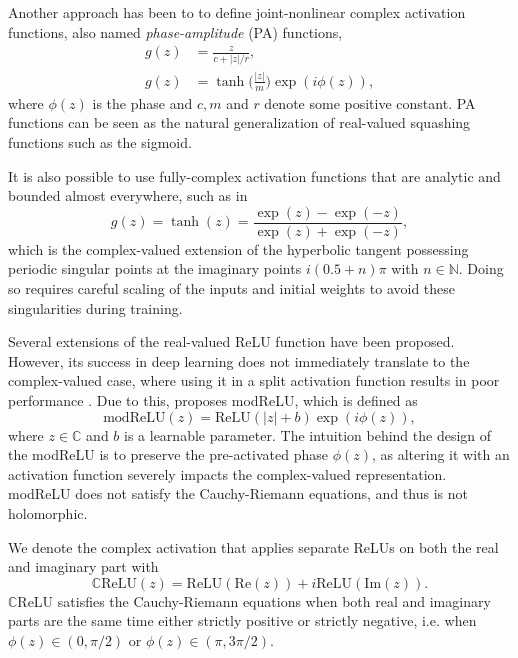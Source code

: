 \documentclass[11pt]{article}
\begin{document}
Another approach has been to to define joint-nonlinear complex activation functions, also named \textit{phase-amplitude} (PA) functions,
\begin{equation}
\begin{split}
g(z) &= \frac{z}{c+|z|/r},\\
g(z) &= \tanh \Big(\frac{|z|}{m}\Big)\exp(i\phi(z)),
\end{split}
\end{equation}
where $\phi(z)$ is the phase and $c, m$ and $r$ denote some positive constant. PA functions can be seen as the natural generalization of real-valued squashing functions such as the sigmoid.

It is also possible to use fully-complex activation functions that are analytic and bounded almost everywhere, such as in
\begin{equation}
g(z) = \tanh(z) = \frac{\exp(z)-\exp(-z)}{\exp(z) + \exp(-z)},
\end{equation}
which is the complex-valued extension of the hyperbolic tangent possessing periodic singular points at the imaginary points $i(0.5 + n)\pi$ with $n\in\mathbb N$. Doing so requires careful scaling of the inputs and initial weights to avoid these singularities during training.

Several extensions of the real-valued ReLU function have been proposed. However, its success in deep learning does not immediately translate to the complex-valued case, where using it in a split activation function results in poor performance  \cite{}. Due to this, \cite{} proposes modReLU, which is defined as
\begin{equation}
\text{modReLU}(z) = \text{ReLU}(|z| + b)\exp(i\phi(z)),
\end{equation}
where $z\in \mathbb C$ and $b$ is a learnable parameter. The intuition behind the design of the modReLU is to preserve the pre-activated phase $\phi(z)$, as altering it with an activation function severely impacts the complex-valued representation. modReLU does not satisfy the Cauchy-Riemann equations, and thus is not holomorphic.

We denote the complex activation that applies separate ReLUs on both the real and imaginary part with
\begin{equation}
\mathbb C\text{ReLU}(z) = \text{ReLU}(\text{Re}(z)) + i\text{ReLU}(\text{Im}(z)).
\end{equation}
$\mathbb C$ReLU satisfies the Cauchy-Riemann equations when both real and imaginary parts are the same time either strictly positive or strictly negative, i.e. when $\phi(z)\in (0, \pi/2)$ or $\phi(z)\in (\pi, 3\pi/2)$.
\end{document}
